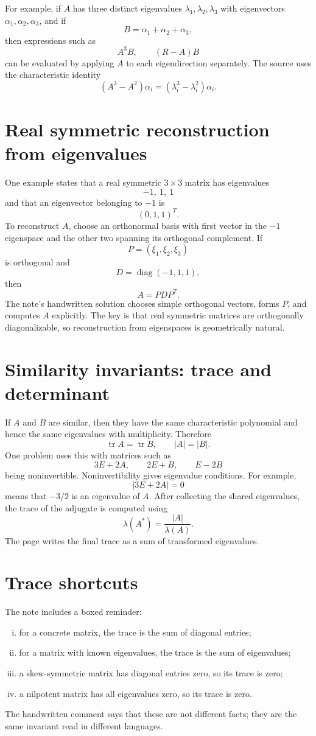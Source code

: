 For example, if $A$ has three distinct eigenvalues $\lambda_1,\lambda_2,\lambda_3$ with eigenvectors $\alpha_1,\alpha_2,\alpha_3$, and if
\[
  B=\alpha_1+\alpha_2+\alpha_3,
\]
then expressions such as
\[
  A^3B,\qquad (R-A)B
\]
can be evaluated by applying $A$ to each eigendirection separately.  The source uses the characteristic identity
\[
  (A^3-A^2)\alpha_i=(\lambda_i^3-\lambda_i^2)\alpha_i.
\]

\section{Real symmetric reconstruction from eigenvalues}

One example states that a real symmetric $3\times3$ matrix has eigenvalues
\[
  -1,\ 1,\ 1
\]
and that an eigenvector belonging to $-1$ is
\[
  (0,1,1)^T.
\]
To reconstruct $A$, choose an orthonormal basis with first vector in the $-1$ eigenspace and the other two spanning its orthogonal complement.  If
\[
  P=(\xi_1,\xi_2,\xi_3)
\]
is orthogonal and
\[
  D=\operatorname{diag}(-1,1,1),
\]
then
\[
  A=PDP^T.
\]
The note's handwritten solution chooses simple orthogonal vectors, forms $P$, and computes $A$ explicitly.  The key is that real symmetric matrices are orthogonally diagonalizable, so reconstruction from eigenspaces is geometrically natural.

\section{Similarity invariants: trace and determinant}

If $A$ and $B$ are similar, then they have the same characteristic polynomial and hence the same eigenvalues with multiplicity.  Therefore
\[
  \operatorname{tr}A=\operatorname{tr}B,\qquad |A|=|B|.
\]
One problem uses this with matrices such as
\[
  3E+2A,\qquad 2E+B,\qquad E-2B
\]
being noninvertible.  Noninvertibility gives eigenvalue conditions.  For example,
\[
  |3E+2A|=0
\]
means that $-3/2$ is an eigenvalue of $A$.  After collecting the shared eigenvalues, the trace of the adjugate is computed using
\[
  \lambda(A^*)=
\frac{|A|}{\lambda(A)}.
\]
The page writes the final trace as a sum of transformed eigenvalues.

\section{Trace shortcuts}

The note includes a boxed reminder:
\begin{enumerate}[(i)]
  \item for a concrete matrix, the trace is the sum of diagonal entries;
  \item for a matrix with known eigenvalues, the trace is the sum of eigenvalues;
  \item a skew-symmetric matrix has diagonal entries zero, so its trace is zero;
  \item a nilpotent matrix has all eigenvalues zero, so its trace is zero.
\end{enumerate}
The handwritten comment says that these are not different facts; they are the same invariant read in different languages.

